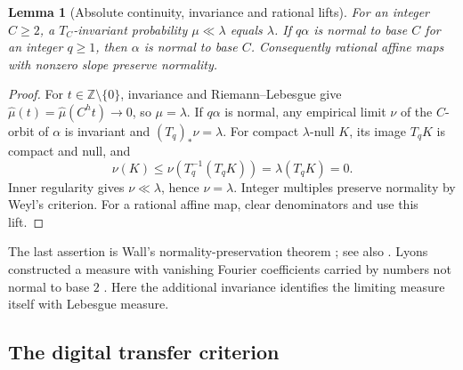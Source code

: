 \documentclass[11pt,a4paper]{article}
\newtheorem{lemma}[theorem]{Lemma}
\newcommand{\Z}{\mathbb Z}
\begin{document}
\begin{lemma}[Absolute continuity, invariance and rational lifts]
\label{lem:rigidity}
For an integer $C\ge2$, a $T_C$-invariant probability
$\mu\ll\lambda$ equals $\lambda$.
If $q\alpha$ is normal to base $C$ for an integer $q\ge1$, then
$\alpha$ is normal to base $C$. Consequently rational affine maps
with nonzero slope preserve normality.
\end{lemma}
\begin{proof}
For $t\in\Z\setminus\{0\}$, invariance and Riemann--Lebesgue give
$\widehat\mu(t)=\widehat\mu(C^ht)\to0$, so $\mu=\lambda$.
If $q\alpha$ is normal, any empirical limit $\nu$ of the
$C$-orbit of $\alpha$ is invariant and $(T_q)_*\nu=\lambda$.
For compact $\lambda$-null $K$, its image $T_qK$ is compact and null,
and
\[
 \nu(K)\le\nu(T_q^{-1}(T_qK))=\lambda(T_qK)=0.
\]
Inner regularity gives $\nu\ll\lambda$, hence $\nu=\lambda$.
Integer multiples preserve normality by Weyl's criterion.
For a rational affine map, clear denominators and use this lift.
\end{proof}
The last assertion is Wall's normality-preservation theorem
\cite{wall}; see also \cite[Proposition 4.25 and Remark 4.28]{bergelsondownarowicz}.
Lyons constructed a measure with vanishing Fourier coefficients
carried by numbers not normal to base $2$ \cite{lyons1986}.
Here the additional invariance identifies the limiting measure itself
with Lebesgue measure.

\subsection{The digital transfer criterion}\label{sec:commonproof}
\end{document}
